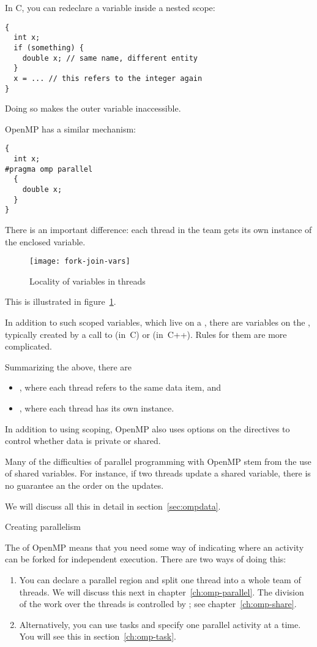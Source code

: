 In C, you can redeclare a variable inside a nested scope:
\begin{lstlisting}
{
  int x;
  if (something) {
    double x; // same name, different entity
  }
  x = ... // this refers to the integer again
}
\end{lstlisting}
Doing so makes the outer variable inaccessible.

OpenMP has a similar mechanism:
\begin{lstlisting}
{
  int x;
#pragma omp parallel
  {
    double x;
  }
}
\end{lstlisting}
There is an important difference: each thread in the team
gets its own instance of the enclosed variable.

\begin{figure}[ht]
\texttt{[image: fork-join-vars]}
\caption{Locality of variables in threads}
\label{fig:threadvars}
\end{figure}
%
This is illustrated in figure~\ref{fig:threadvars}.

In addition to such scoped variables, which live on a ,
there are variables on the
, typically created by a call to 
(in~C) or  (in~C++). Rules for them are more complicated.

Summarizing the above, there are
\begin{itemize}
\item {},
  where each thread refers to the same data item, and 
\item {},
  where each thread has its own instance.
\end{itemize}
In addition to using scoping, OpenMP also uses options on the directives
to control whether data is private or shared.

Many of the difficulties of parallel programming with OpenMP stem
from the use of shared variables. For instance, if two threads
update a shared variable, there is no guarantee an the order on the updates.

We will discuss all this in detail in section~\ref{sec:ompdata}.

 {Creating parallelism}
\label{sec:omp-howmany}

The  of OpenMP means that you need some way of
indicating where an activity can be forked for independent execution.
There are two ways of doing this:
\begin{enumerate}
\item You can declare a parallel region and
  split one thread into a whole team of threads.
  We will discuss this next in chapter~\ref{ch:omp-parallel}.
  The division of the work over the threads
  is controlled by ;
  see chapter~\ref{ch:omp-share}.
\item Alternatively, you can use tasks and specify one parallel
  activity at a time. You will see this in section~\ref{ch:omp-task}.
\end{enumerate}

